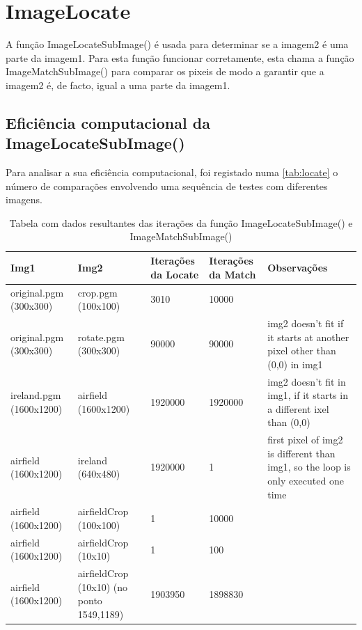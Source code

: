 \section{ImageLocate}\label{sec:imagelocate}
\fontsize{12}{12}\selectfont
    \par A função ImageLocateSubImage() é usada para determinar se a imagem2 é uma parte da imagem1.
        Para esta função funcionar corretamente, esta chama a função ImageMatchSubImage() para comparar os pixeis 
        de modo a garantir que a imagem2 é, de facto, igual a uma parte da imagem1.

\subsection{Eficiência computacional da ImageLocateSubImage()}
    \par Para analisar a sua eficiência computacional, foi registado numa \autoref{tab:locate} o 
    número de comparações envolvendo uma sequência de testes com diferentes imagens. 

\begin{center}
    \begin{table}[h]
        \centering
        \begin{tabular}{| p{2cm} | p{3cm} | p{1.5cm} | p{2cm} | p{5cm} |}
        \hline
        \textbf{Img1} & \textbf{Img2} & \textbf{Iterações da Locate} & \textbf{Iterações da Match} & \textbf{Observações} \\ \hline
        original.pgm (300x300) & crop.pgm (100x100) & 3010 & 10000 & \\ \hline
        original.pgm (300x300) & rotate.pgm (300x300) & 90000 & 90000 & 
            img2 doesn't fit if it starts at another pixel other than (0,0) in img1 \\ \hline
        ireland.pgm (1600x1200) & airfield (1600x1200) & 1920000 & 1920000 &
            img2 doesn't fit in img1, if it starts in a different ixel than (0,0)  \\ \hline
        airfield (1600x1200) & ireland (640x480) & 1920000 & 1 &
            first pixel of img2 is different than img1, so the loop is only executed one time \\ \hline
        airfield (1600x1200) & airfieldCrop (100x100) & 1 & 10000 &  \\ \hline
        airfield (1600x1200) & airfieldCrop (10x10)  & 1 & 100 & \\ \hline
        airfield (1600x1200) & airfieldCrop (10x10) (no ponto 1549,1189) & 1903950 & 1898830 & \\ \hline                 
        \end{tabular}
        \caption{Tabela com dados resultantes das iterações da função ImageLocateSubImage() e ImageMatchSubImage()}
        \label{tab:locate}
    \end{table}
\end{center}

